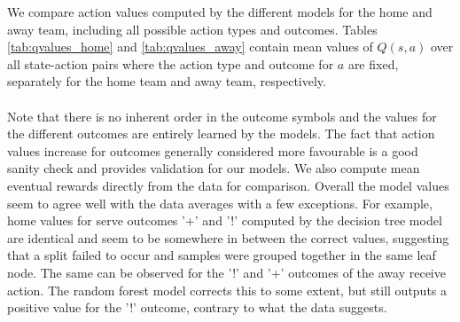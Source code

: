 \documentclass{sfuthesis}
\begin{document}
We compare action values computed by the different models for the home and away team, including all possible action types and outcomes. Tables \ref{tab:qvalues_home} and \ref{tab:qvalues_away} contain mean values of $Q(s,a)$ over all state-action pairs where the action type and outcome for $a$ are fixed, separately for the home team and away team, respectively.\\\\
Note that there is no inherent order in the outcome symbols and the values for the different outcomes are entirely learned by the models. The fact that action values increase for outcomes generally considered more favourable is a good sanity check and provides validation for our models. We also compute mean eventual rewards directly from the data for comparison. Overall the model values seem to agree well with the data averages with a few exceptions. For example, home values for serve outcomes '+' and '!' computed by the decision tree model are identical and seem to be somewhere in between the correct values, suggesting that a split failed to occur and samples were grouped together in the same leaf node. The same can be observed for the '!' and '+' outcomes of the away receive action. The random forest model corrects this to some extent, but still outputs a positive value for the '!' outcome, contrary to what the data suggests.
\end{document}
